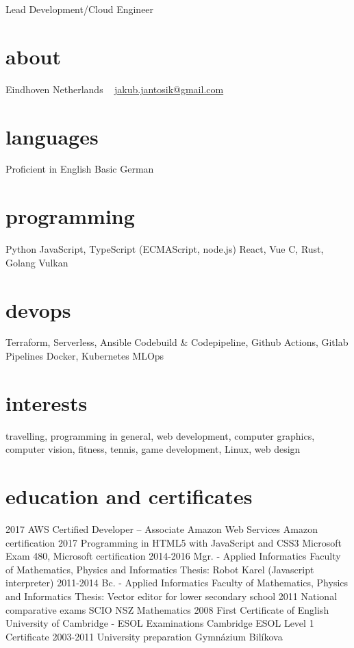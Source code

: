 \documentclass[]{friggeri-cv}
\begin{document}
{Lead Development/Cloud Engineer}

\begin{aside}
  \section{about}
  Eindhoven
  Netherlands
  ~
  \href{mailto:jakub.jantosik@gmail.com}{jakub.jantosik@gmail.com}
  \section{languages}
  Proficient in English
  Basic German
  \section{programming}
  Python
  JavaScript, TypeScript
  (ECMAScript, node.js)
  React, Vue
  C, Rust, Golang
  Vulkan
  \section{devops}
  Terraform, Serverless, Ansible
  Codebuild \& Codepipeline, Github Actions, Gitlab Pipelines
  Docker, Kubernetes
  MLOps
\end{aside}

\section{interests}

travelling, programming in general, web development, computer graphics, computer vision, fitness, tennis, game development, Linux,  web design

\section{education and certificates}

\begin{entrylist}
  \entry
  {2017}
  {AWS Certified Developer – Associate}
  {Amazon Web Services}
  {Amazon certification}
  \entry
  {2017}
  {Programming in HTML5 with JavaScript and CSS3}
  {Microsoft}
  {Exam 480, Microsoft certification}
  \entry
  {2014-2016}
  {Mgr. - Applied Informatics}
  {Faculty of Mathematics, Physics and Informatics}
  {Thesis: Robot Karel (Javascript interpreter)}
  \entry
  {2011-2014}
  {Bc. - Applied Informatics}
  {Faculty of Mathematics, Physics and Informatics}
  {Thesis: Vector editor for lower secondary school}
  \entry
  {2011}
  {National comparative exams}
  {SCIO}
  {NSZ Mathematics}
  \entry
  {2008}
  {First Certificate of English}
  {University of Cambridge - ESOL Examinations}
  {Cambridge ESOL Level 1 Certificate}
  \entry
  {2003-2011}
  {University preparation}
  {Gymnázium Bilíkova}
  {}
\end{entrylist}
\end{document}
